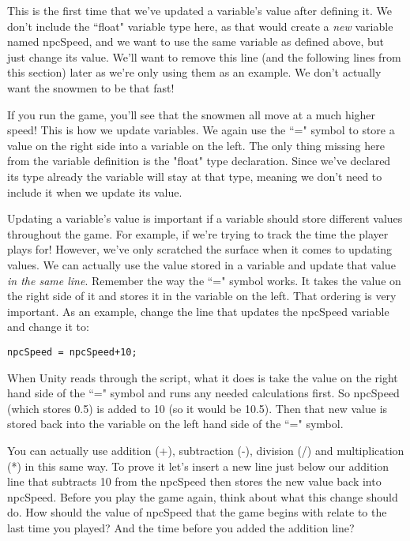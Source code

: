 \documentclass{article}
\begin{document}
This is the first time that we've updated a variable's value after defining it. We don't include the ``float" variable type here, as that would create a \textit{new} variable named npcSpeed, and we want to use the same variable as defined above, but just change its value. We'll want to remove this line (and the following lines from this section) later as we're only using them as an example. We don't actually want the snowmen to be that fast!

If you run the game, you'll see that the snowmen all move at a much higher speed! This is how we update variables. We again use the ``=" symbol to store a value on the right side into a variable on the left. The only thing missing here from the variable definition is the "float" type declaration. Since we've declared its type already the variable will stay at that type, meaning we don't need to include it when we update its value. 

Updating a variable's value is important if a variable should store different values throughout the game. For example, if we're trying to track the time the player plays for! However, we've only scratched the surface when it comes to updating values. We can actually use the value stored in a variable and update that value \textit{in the same line}. Remember the way the ``=" symbol works. It takes the value on the right side of it and stores it in the variable on the left. That ordering is very important. As an example, change the line that updates the npcSpeed variable and change it to:  

\lstset{style=sharpc}
\begin{lstlisting}
npcSpeed = npcSpeed+10;
\end{lstlisting}

When Unity reads through the script, what it does is take the value on the right hand side of the ``=" symbol and runs any needed calculations first. So npcSpeed (which stores 0.5) is added to 10 (so it would be 10.5). Then that new value is stored back into the variable on the left hand side of the ``=" symbol. 

\noindent{}

You can actually use addition (+), subtraction (-), division (/) and multiplication (*) in this same way. To prove it let's insert a new line just below our addition line that subtracts 10 from the npcSpeed then stores the new value back into npcSpeed. Before you play the game again, think about what this change should do. How should the value of npcSpeed that the game begins with relate to the last time you played? And the time before you added the addition line? 
\end{document}

